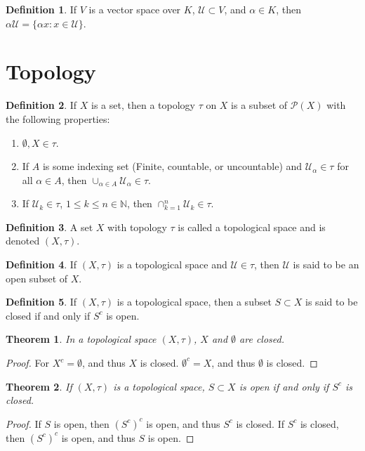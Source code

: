 \documentclass[oneside]{book}
\newtheorem{theorem}{Theorem}[section]
\theoremstyle{definition}
\newtheorem{definition}{Definition}[section]
\begin{document}
\begin{definition}
If $V$ is a vector space over $K$, $\mathcal{U}\subset V$, and $\alpha \in K$, then $\alpha \mathcal{U} = \{\alpha x:x\in \mathcal{U}\}$.
\end{definition}

\section{Topology}

\begin{definition}
If $X$ is a set, then a topology $\tau$ on $X$ is a subset of $\mathcal{P}(X)$ with the following properties:
\begin{enumerate}
\item $\emptyset, X\in \tau$.
\item If $A$ is some indexing set (Finite, countable, or uncountable) and $\mathcal{U}_\alpha \in \tau$ for all $\alpha \in A$, then $\cup_{\alpha \in A} \mathcal{U}_{\alpha} \in \tau$.
\item If $\mathcal{U}_k\in \tau$, $1\leq k \leq n\in \mathbb{N}$, then $\cap_{k=1}^{n}\mathcal{U}_k \in \tau$.
\end{enumerate}
\end{definition}

\begin{definition}
A set $X$ with topology $\tau$ is called a topological space and is denoted $(X,\tau)$.
\end{definition}

\begin{definition}
If $(X,\tau)$ is a topological space and $\mathcal{U}\in \tau$, then $\mathcal{U}$ is said to be an open subset of $X$.
\end{definition}

\begin{definition}
If $(X,\tau)$ is a topological space, then a subset $S\subset X$ is said to be closed if and only if $S^c$ is open.
\end{definition}

\begin{theorem}
In a topological space $(X,\tau)$, $X$ and $\emptyset$ are closed.
\end{theorem}
\begin{proof}
For $X^c = \emptyset$, and thus $X$ is closed. $\emptyset^c=X$, and thus $\emptyset$ is closed.
\end{proof}

\begin{theorem}
If $(X,\tau)$ is a topological space, $S\subset X$ is open if and only if $S^c$ is closed.
\end{theorem}
\begin{proof}
If $S$ is open, then $(S^c)^c$ is open, and thus $S^c$ is closed. If $S^c$ is closed, then $(S^c)^c$ is open, and thus $S$ is open.
\end{proof}
\end{document}
